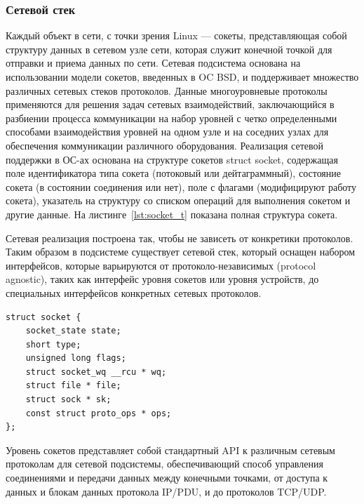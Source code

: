 \subsubsection{Сетевой стек}

Каждый объект в сети, с точки зрения Linux --- сокеты, представляющая собой структуру данных в сетевом узле сети, которая служит конечной точкой для отправки и приема данных по сети. Сетевая подсистема основана на использовании модели сокетов, введенных в OC BSD, и поддерживает множество различных сетевых стеков протоколов.
Данные многоуровневые протоколы применяются для решения задач сетевых взаимодействий, заключающийся в разбиении процесса коммуникации на набор уровней с четко определенными способами взаимодействия уровней на одном узле и на соседних узлах для обеспечения коммуникации различного оборудования.
Реализация сетевой поддержки в ОС-ах основана на структуре сокетов struct socket, содержащая поле идентификатора типа сокета (потоковый или дейтаграммный), состояние сокета (в состоянии соединения или нет), поле с флагами (модифицируют работу сокета), указатель на структуру со списком операций для выполнения сокетом и другие данные. На листинге~\ref{lst:socket_t} показана полная структура сокета.

Сетевая реализация построена так, чтобы не зависеть от конкретики протоколов.
Таким образом в подсистеме существует сетевой стек, который оснащен набором интерфейсов, которые варьируются от протоколо-независимых (protocol agnostic), таких как интерфейс уровня сокетов или уровня устройств, до специальных интерфейсов конкретных сетевых протоколов. 

\begin{lstlisting}[label=lst:socket_t,caption=Структура сокета struct socket \cite{socket_struct}]
struct socket {
	socket_state state;
	short type;
	unsigned long flags;
	struct socket_wq __rcu * wq;
	struct file * file;
	struct sock * sk;
	const struct proto_ops * ops;
};  
\end{lstlisting}	

Уровень сокетов представляет собой стандартный API к различным сетевым протоколам для сетевой подсистемы, обеспечивающий способ управления соединениями и передачи данных между конечными точками, от доступа к данных и блокам данных протокола IP/PDU, и до протоколов TCP/UDP.

